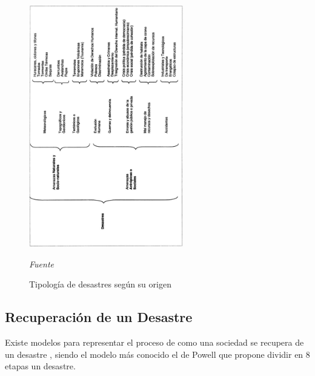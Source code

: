 \documentclass[11pt,openany]{book}
\begin{document}
	\begin{figure}[htb]
			\centering
			\includegraphics[width=0.6\textwidth]{imagenes/desastres.jpg}
			\caption{Tipología de desastres según su origen}
			\textsl{Fuente} \cite{vargas2002}
			\label{Desastres}
	\end{figure}

	\subsection{Recuperación de un Desastre}
	Existe modelos para representar el proceso de como una sociedad se recupera de un desastre \cite{Al-Akkad}, siendo el modelo más conocido el de Powell que propone dividir en 8 etapas un desastre.
	
\end{document}
